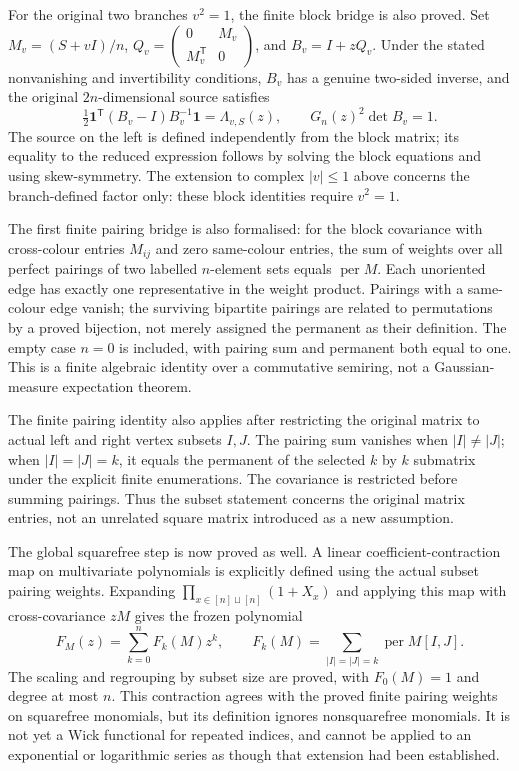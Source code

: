 \documentclass[11pt]{article}
\begin{document}
For the original two branches $v^2=1$, the finite block bridge is also proved. Set $M_v=(S+vI)/n$, $Q_v=\left(\begin{smallmatrix}0&M_v\\M_v^{\mathsf T}&0\end{smallmatrix}\right)$, and $B_v=I+zQ_v$. Under the stated nonvanishing and invertibility conditions, $B_v$ has a genuine two-sided inverse, and the original $2n$-dimensional source satisfies
\[
 \tfrac12\mathbf1^{\mathsf T}(B_v-I)B_v^{-1}\mathbf1=\Lambda_{v,S}(z),
 \qquad G_n(z)^2\det B_v=1.
\]
The source on the left is defined independently from the block matrix; its equality to the reduced expression follows by solving the block equations and using skew-symmetry. The extension to complex $|v|\le1$ above concerns the branch-defined factor only: these block identities require $v^2=1$.

The first finite pairing bridge is also formalised: for the block covariance with cross-colour entries $M_{ij}$ and zero same-colour entries, the sum of weights over all perfect pairings of two labelled $n$-element sets equals $\operatorname{per}M$. Each unoriented edge has exactly one representative in the weight product. Pairings with a same-colour edge vanish; the surviving bipartite pairings are related to permutations by a proved bijection, not merely assigned the permanent as their definition. The empty case $n=0$ is included, with pairing sum and permanent both equal to one. This is a finite algebraic identity over a commutative semiring, not a Gaussian-measure expectation theorem.

The finite pairing identity also applies after restricting the original matrix to actual left and right vertex subsets $I,J$. The pairing sum vanishes when $|I|\ne|J|$; when $|I|=|J|=k$, it equals the permanent of the selected $k$ by $k$ submatrix under the explicit finite enumerations. The covariance is restricted before summing pairings. Thus the subset statement concerns the original matrix entries, not an unrelated square matrix introduced as a new assumption.

The global squarefree step is now proved as well. A linear coefficient-contraction map on multivariate polynomials is explicitly defined using the actual subset pairing weights. Expanding $\prod_{x\in[n]\sqcup[n]}(1+X_x)$ and applying this map with cross-covariance $zM$ gives the frozen polynomial
\[
 F_M(z)=\sum_{k=0}^{n}F_k(M)z^k,\qquad
 F_k(M)=\sum_{|I|=|J|=k}\operatorname{per}M[I,J].
\]
The scaling and regrouping by subset size are proved, with $F_0(M)=1$ and degree at most $n$. This contraction agrees with the proved finite pairing weights on squarefree monomials, but its definition ignores nonsquarefree monomials. It is not yet a Wick functional for repeated indices, and cannot be applied to an exponential or logarithmic series as though that extension had been established.
\end{document}
